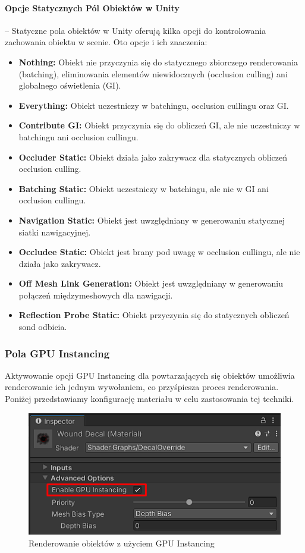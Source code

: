 \paragraph{Opcje Statycznych Pól Obiektów w Unity}\hspace{-1em} -- Statyczne pola obiektów w Unity oferują kilka opcji do kontrolowania zachowania obiektu w scenie. Oto opcje i ich znaczenia:
\begin{itemize}
    \item \textbf{Nothing:} Obiekt nie przyczynia się do statycznego zbiorczego renderowania (batching), eliminowania elementów niewidocznych (occlusion culling) ani globalnego oświetlenia (GI).
    \item \textbf{Everything:} Obiekt uczestniczy w batchingu, occlusion cullingu oraz GI.
    \item \textbf{Contribute GI:} Obiekt przyczynia się do obliczeń GI, ale nie uczestniczy w batchingu ani occlusion cullingu.
    \item \textbf{Occluder Static:} Obiekt działa jako zakrywacz dla statycznych obliczeń occlusion culling.
    \item \textbf{Batching Static:} Obiekt uczestniczy w batchingu, ale nie w GI ani occlusion cullingu.
    \item \textbf{Navigation Static:} Obiekt jest uwzględniany w generowaniu statycznej siatki nawigacyjnej.
    \item \textbf{Occludee Static:} Obiekt jest brany pod uwagę w occlusion cullingu, ale nie działa jako zakrywacz.
    \item \textbf{Off Mesh Link Generation:} Obiekt jest uwzględniany w generowaniu połączeń międzymeshowych dla nawigacji.
    \item \textbf{Reflection Probe Static:} Obiekt przyczynia się do statycznych obliczeń sond odbicia.
\end{itemize}

\subsubsection{Pola GPU Instancing}
Aktywowanie opcji GPU Instancing dla powtarzających się obiektów umożliwia renderowanie ich jednym wywołaniem, co przyśpiesza proces renderowania. Poniżej przedstawiamy konfigurację materiału w celu zastosowania tej techniki.
\begin{figure}[h]
    \centering
    \includegraphics[width=0.85\linewidth]{Images/gpuInstanceOptimization.png}
    \caption{Renderowanie obiektów z użyciem GPU Instancing}
\end{figure}


